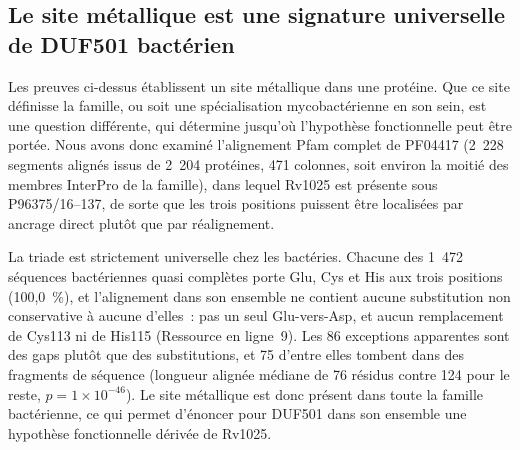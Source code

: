\documentclass[11pt,a4paper]{article}
\begin{document}
\FloatBarrier
\subsection{Le site métallique est une signature universelle de DUF501 bactérien}

Les preuves ci-dessus établissent un site métallique dans une protéine. Que ce site définisse la famille, ou soit une spécialisation mycobactérienne en son sein, est une question différente, qui détermine jusqu'où l'hypothèse fonctionnelle peut être portée. Nous avons donc examiné l'alignement Pfam complet de PF04417 (2~228 segments alignés issus de 2~204 protéines, 471 colonnes, soit environ la moitié des membres InterPro de la famille), dans lequel Rv1025 est présente sous P96375/16--137, de sorte que les trois positions puissent être localisées par ancrage direct plutôt que par réalignement.

La triade est strictement universelle chez les bactéries. Chacune des 1~472 séquences bactériennes quasi complètes porte Glu, Cys et His aux trois positions (100,0~\%), et l'alignement dans son ensemble ne contient aucune substitution non conservative à aucune d'elles~: pas un seul Glu-vers-Asp, et aucun remplacement de Cys113 ni de His115 (Ressource en ligne~9). Les 86 exceptions apparentes sont des gaps plutôt que des substitutions, et 75 d'entre elles tombent dans des fragments de séquence (longueur alignée médiane de 76 résidus contre 124 pour le reste, $p=1\times10^{-46}$). Le site métallique est donc présent dans toute la famille bactérienne, ce qui permet d'énoncer pour DUF501 dans son ensemble une hypothèse fonctionnelle dérivée de Rv1025.
\end{document}
